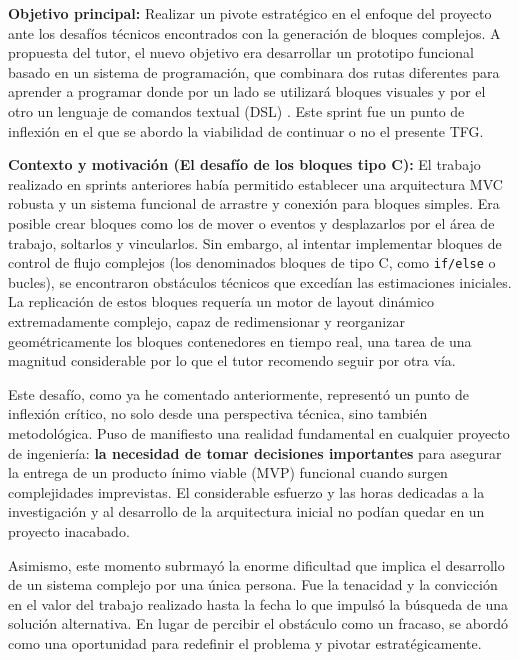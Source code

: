 \item \textbf{Objetivo principal:} Realizar un pivote estratégico en el enfoque del proyecto ante los desafíos técnicos encontrados con la generación de bloques complejos. A propuesta del tutor, el nuevo objetivo era desarrollar un prototipo funcional basado en un sistema de programación, que combinara dos rutas diferentes para aprender a programar donde por un lado se utilizará bloques visuales y por el otro un lenguaje de comandos textual (DSL) \cite{DSL}\cite{lenguaje_DSL}. Este sprint fue un punto de inflexión en el que se abordo la viabilidad de continuar o no el presente TFG. 

\item \textbf{Contexto y motivación (El desafío de los bloques tipo C):}
El trabajo realizado en sprints anteriores había permitido establecer una arquitectura MVC robusta y un sistema funcional de arrastre y conexión para bloques simples. Era posible crear bloques como los de mover o eventos y desplazarlos por el área de trabajo, soltarlos y vincularlos. Sin embargo, al intentar implementar bloques de control de flujo complejos (los denominados bloques de tipo C, como \texttt{if/else} o bucles), se encontraron obstáculos técnicos que excedían las estimaciones iniciales. La replicación de estos bloques requería un motor de layout dinámico extremadamente complejo, capaz de redimensionar y reorganizar geométricamente los bloques contenedores en tiempo real, una tarea de una magnitud considerable por lo que el tutor recomendo seguir por otra vía.

Este desafío, como ya he comentado anteriormente, representó un punto de inflexión crítico, no solo desde una perspectiva técnica, sino también metodológica. Puso de manifiesto una realidad fundamental en cualquier proyecto de ingeniería: \textbf{la necesidad de tomar decisiones importantes} para asegurar la entrega de un producto ínimo viable (MVP) funcional cuando surgen complejidades imprevistas. El considerable esfuerzo y las horas dedicadas a la investigación y al desarrollo de la arquitectura inicial no podían quedar en un proyecto inacabado.

Asimismo, este momento subrmayó la enorme dificultad que implica el desarrollo de un sistema complejo por una única persona. Fue la tenacidad y la convicción en el valor del trabajo realizado hasta la fecha lo que impulsó la búsqueda de una solución alternativa. En lugar de percibir el obstáculo como un fracaso, se abordó como una oportunidad para redefinir el problema y pivotar estratégicamente.

